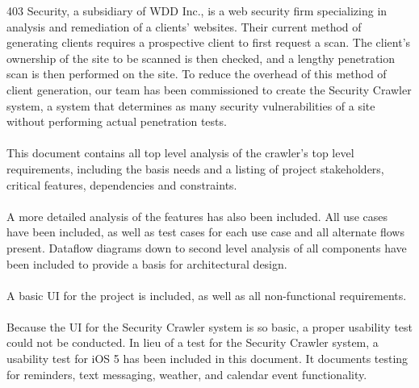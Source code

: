 403 Security, a subsidiary of WDD Inc., is a web security firm specializing in analysis and remediation of a clients' websites.  Their current method of generating clients requires a prospective client to first request a scan.  The client's ownership of the site to be scanned is then checked, and a lengthy penetration scan is then performed on the site.  To reduce the overhead of this method of client generation, our team has been commissioned to create the Security Crawler system, a system that determines as many security vulnerabilities of a site without performing actual penetration tests.\\\\
This document contains all top level analysis of the crawler's top level requirements, including the basis needs and a listing of project stakeholders, critical features, dependencies and constraints. \\\\
A more detailed analysis of the features has also been included.  All use cases have been included, as well as test cases for each use case and all alternate flows present.  Dataflow diagrams down to second level analysis of all components have been included to provide a basis for architectural design.\\\\
A basic UI for the project is included, as well as all non-functional requirements.\\\\
Because the UI for the Security Crawler system is so basic, a proper usability test could not be conducted.  In lieu of a test for the Security Crawler system, a usability test for iOS 5 has been included in this document.  It documents testing for reminders, text messaging, weather, and calendar event functionality.
